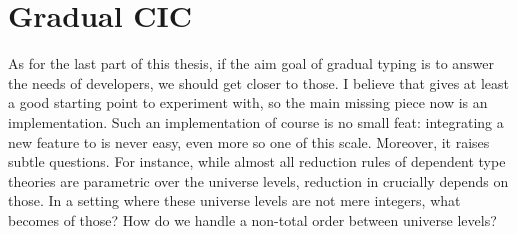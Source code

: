 \section{Gradual CIC}

As for the last part of this thesis, if the aim goal of gradual typing
is to answer the needs of developers, we should get closer to those.
I believe that  gives at least a good starting point to experiment with,
so the main missing piece now is an implementation.
Such an implementation of course is no small feat: integrating a new feature to  is
never easy, even more so one of this scale.
Moreover, it raises subtle questions. For instance, while almost all reduction rules of
dependent type theories are parametric over the universe levels,
reduction in  crucially depends on those.
In a setting where these universe levels are not mere integers,
what becomes of those? How do we handle a non-total order between universe levels?
